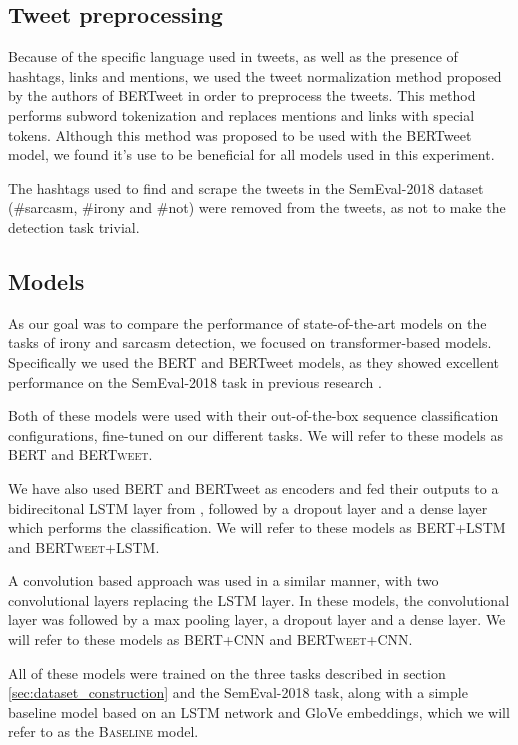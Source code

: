 \documentclass[10pt, a4paper]{article}
\begin{document}
\subsection{Tweet preprocessing}
Because of the specific language used in tweets, as well as the presence of hashtags, links and mentions, we used the
tweet normalization method proposed by the authors of BERTweet \citep{bertweet} in order to preprocess the tweets. This method
performs subword tokenization and replaces mentions and links with special tokens. Although this method was proposed to be 
used with the BERTweet model, we found it's use to be beneficial for all models used in this experiment.

The hashtags used to find and scrape the tweets in the SemEval-2018 dataset (\#sarcasm, \#irony and \#not) were removed
from the tweets, as not to make the detection task trivial.

\subsection{Models}\label{sec:models}

As our goal was to compare the performance of state-of-the-art models on the tasks of irony and sarcasm detection, we 
focused on transformer-based models. Specifically we used the BERT \citep{devlin-etal-2019-bert} and BERTweet \citep{bertweet} models,
as they showed excellent performance on the SemEval-2018 task in previous research \citep{transformers4irony-2020,bertweet}.

Both of these models were used with their out-of-the-box sequence classification configurations, fine-tuned on our 
different tasks. We will refer to these models as \textsc{BERT} and \textsc{BERTweet}.

We have also used BERT and BERTweet as encoders and fed their outputs to a bidirecitonal LSTM layer from \citep{paszke2017automatic}, followed by 
a dropout layer and a dense layer which performs the classification. We will refer to these models as \textsc{BERT+LSTM}
and \textsc{BERTweet+LSTM}. 

A convolution based approach was used in a similar manner, with two convolutional layers
replacing the LSTM layer. In these models, the convolutional layer was followed by a max pooling layer, a dropout layer
and a dense layer. We will refer to these models as \textsc{BERT+CNN} and \textsc{BERTweet+CNN}.

All of these models were trained on the three tasks described in section \ref{sec:dataset_construction} and the SemEval-2018
task, along with a simple baseline model based on an LSTM network and GloVe embeddings, which we will refer to as the
\textsc{Baseline} model. 
\end{document}
